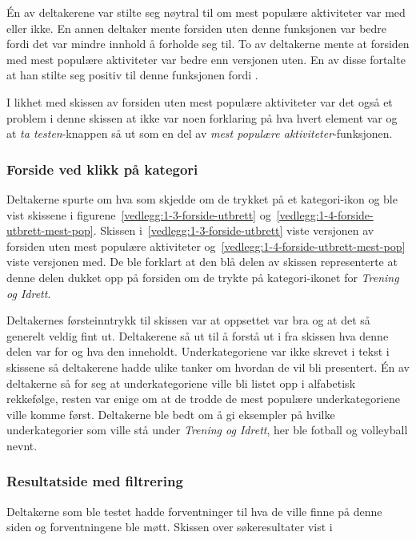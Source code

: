 Én av deltakerene var stilte seg nøytral til om mest populære aktiviteter var med eller ikke. En annen deltaker mente forsiden uten denne funksjonen var bedre fordi det var mindre innhold å forholde seg til. To av deltakerne mente at forsiden med mest populære aktiviteter var bedre enn versjonen uten. En av disse fortalte at han stilte seg positiv til denne funksjonen fordi .

I likhet med skissen av forsiden uten mest populære aktiviteter var det også et problem i denne skissen at ikke var noen forklaring på hva hvert element var og at {\em  ta testen}-knappen så ut som en del av {\em  mest populære aktiviteter}-funksjonen. 

\subsubsection{Forside ved klikk på kategori}
Deltakerne spurte om hva som skjedde om de trykket på et kategori-ikon og ble vist skissene i figurene~\ref{vedlegg:1-3-forside-utbrett} og~\ref{vedlegg:1-4-forside-utbrett-mest-pop}. Skissen i~\ref{vedlegg:1-3-forside-utbrett} viste versjonen av forsiden uten mest populære aktiviteter og~\ref{vedlegg:1-4-forside-utbrett-mest-pop} viste versjonen med. De ble forklart at den blå delen av skissen representerte at denne delen dukket opp på forsiden om de trykte på kategori-ikonet for {\em  Trening og Idrett}.

Deltakernes førsteinntrykk til skissen var at oppsettet var bra og at det så generelt veldig fint ut. Deltakerene så ut til å forstå ut i fra skissen hva denne delen var for og hva den inneholdt. Underkategoriene var ikke skrevet i tekst i skissene så deltakerene hadde ulike tanker om hvordan de vil bli presentert. Én av deltakerne så for seg at underkategoriene ville bli listet opp i alfabetisk rekkefølge, resten var enige om at de trodde de mest populære underkategoriene ville komme først. Deltakerne ble bedt om å gi eksempler på hvilke underkategorier som ville stå under {\em  Trening og Idrett}, her ble fotball og volleyball nevnt.

\subsubsection{Resultatside med filtrering}

Deltakerne som ble testet hadde forventninger til hva de ville finne på denne siden og forventningene ble møtt. 
Skissen over søkeresultater vist i

